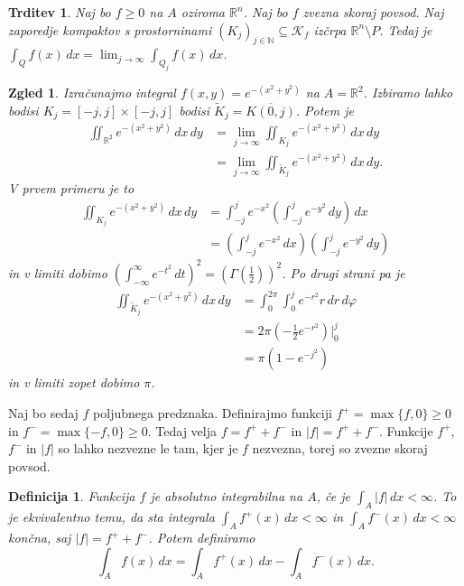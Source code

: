 \documentclass[10pt, a4paper]{article}
\newtheorem{trditev}[izr]{Trditev}
\newtheorem{defi}{Definicija}[section]
\newenvironment{noticeB}{%
  \tcolorbox[%
  notitle,
  empty,
  enhanced,  %
  breakable,
  coltext=black,
  colback=white, 
  fontupper=\rmfamily,
  parbox=false,
  noparskip,
  sharp corners,
  boxrule=-1pt,  %
  frame hidden,
  left=7pt,  %
  right=7pt,
  top=5pt,
  bottom=5pt,
  before skip=2.5ex plus 2pt,
  after skip=2.5ex plus 2pt,
  borderline west = {1.5pt}{-0.1pt}{blue!30!black}, %
  overlay unbroken and last={%
    \draw[color=black, line width=1.25pt]
    ($(frame.south west)+(1.pt, -0.1pt)$) -- ++(2em, 0);
  }
  ]}
{\endtcolorbox}
\newenvironment{definicija}{\begin{defi}\begin{noticeB}}{%
    \end{noticeB}\end{defi}}
\newtheorem{zgled}{Zgled}[section]
\newcommand{\N}{\mathbb {N}}
\newcommand{\R}{\mathbb {R}}
\begin{document}
\begin{trditev}
    Naj bo $f \geq 0$ na $A$ oziroma $\R^n$. Naj bo $f$ zvezna skoraj povsod.
    Naj zaporedje kompaktov s prostorninami $(K_j)_{j \in \N} \subseteq \mathcal{K}_f$ izčrpa $\R^n \setminus P$.
    Tedaj je $\int_Q f(x)\, dx = \lim_{j \to \infty} \int_{Q_{j}} f(x)\, dx$.
\end{trditev}

\begin{zgled}
    Izračunajmo integral $f(x, y) = e^{-(x^2 + y^2)}$ na $A = \R^2$.
    Izbiramo lahko bodisi $K_j = [-j, j] \times [-j, j]$ bodisi $\widetilde{K}_j = \overline{K(0, j)}$.
    Potem je 
    \begin{align*}
        \iint_{\R^2} e^{-(x^2 + y^2)}\, dx\, dy &= \lim_{j \to \infty} \iint_{K_j} e^{-(x^2 + y^2)}\, dx\, dy\\
        &= \lim_{j \to \infty} \iint_{\widetilde{K}_j} e^{-(x^2 + y^2)}\, dx\, dy.
    \end{align*}
    V prvem primeru je to 
    \begin{align*}
        \iint_{K_j} e^{-(x^2 + y^2)}\, dx\, dy &= \int_{-j} ^j e^{-x^2} \left(\int_{-j} ^j e^{-y^2}\, dy\right)\, dx\\
        &= \left(\int_{-j} ^j e^{-x^2}\, dx\right) \left(\int_{-j} ^j e^{-y^2}\, dy\right)
    \end{align*}
    in v limiti dobimo $\left(\int_{-\infty} ^\infty e^{-t^2}\, dt\right)^2 = \left(\Gamma \left(\frac{1}{2}\right)\right)^2$.
    Po drugi strani pa je 
    \begin{align*}
        \iint_{\widetilde{K}_j} e^{-(x^2 + y^2)}\, dx\, dy &=\int_0 ^{2\pi} \int_0 ^{j} e^{-r^2} r\, dr\, d\varphi\\
        &= 2 \pi \left(-\frac{1}{2} e^{-r^2}\right)\Big|_0 ^j\\
        &= \pi \left(1 - e^{-j^2}\right)
    \end{align*}
    in v limiti zopet dobimo $\pi$.
\end{zgled}

Naj bo sedaj $f$ poljubnega predznaka. Definirajmo funkciji $f^+ = \max\{f, 0\}\geq 0$
in $f^- = \max \{-f, 0\} \geq 0$.
Tedaj velja $f = f^+ + f^-$ in $|f| = f^+ + f^-$.
Funkcije $f^+$, $f^-$ in $|f|$ so lahko nezvezne le tam, kjer je $f$ nezvezna, torej so zvezne skoraj povsod.

\begin{definicija}
    Funkcija $f$ je absolutno integrabilna na $A$, če je $\int_A |f|\, dx < \infty$.
    To je ekvivalentno temu, da sta integrala $\int_A f^+ (x)\, dx < \infty$ in 
    $\int_A f^- (x)\, dx < \infty$ končna, saj $|f| = f^+ + f^-$.
    Potem definiramo $$\int_A f(x)\, dx = \int_A f^+ (x)\, dx - \int_A f^- (x)\, dx.$$
\end{definicija}
\end{document}

